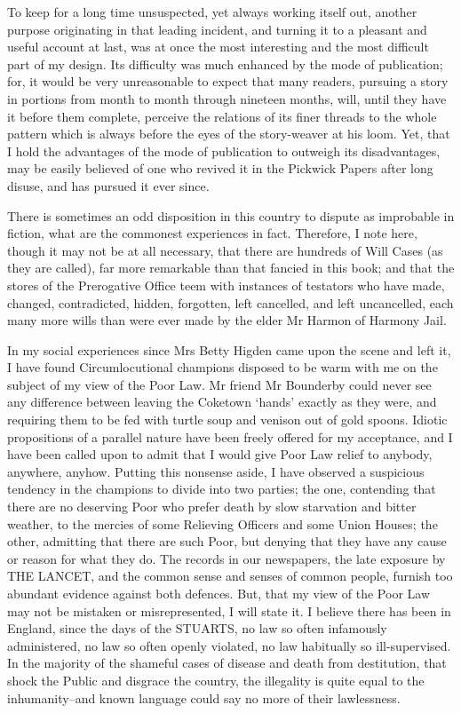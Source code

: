 To keep for a long time unsuspected, yet always working itself out,
another purpose originating in that leading incident, and turning it to
a pleasant and useful account at last, was at once the most interesting
and the most difficult part of my design. Its difficulty was much
enhanced by the mode of publication; for, it would be very unreasonable
to expect that many readers, pursuing a story in portions from month
to month through nineteen months, will, until they have it before them
complete, perceive the relations of its finer threads to the whole
pattern which is always before the eyes of the story-weaver at his loom.
Yet, that I hold the advantages of the mode of publication to outweigh
its disadvantages, may be easily believed of one who revived it in the
Pickwick Papers after long disuse, and has pursued it ever since.

There is sometimes an odd disposition in this country to dispute as
improbable in fiction, what are the commonest experiences in fact.
Therefore, I note here, though it may not be at all necessary, that
there are hundreds of Will Cases (as they are called), far more
remarkable than that fancied in this book; and that the stores of the
Prerogative Office teem with instances of testators who have made,
changed, contradicted, hidden, forgotten, left cancelled, and left
uncancelled, each many more wills than were ever made by the elder Mr
Harmon of Harmony Jail.

In my social experiences since Mrs Betty Higden came upon the scene and
left it, I have found Circumlocutional champions disposed to be
warm with me on the subject of my view of the Poor Law. Mr friend Mr
Bounderby could never see any difference between leaving the Coketown
‘hands’ exactly as they were, and requiring them to be fed with turtle
soup and venison out of gold spoons. Idiotic propositions of a parallel
nature have been freely offered for my acceptance, and I have been
called upon to admit that I would give Poor Law relief to anybody,
anywhere, anyhow. Putting this nonsense aside, I have observed a
suspicious tendency in the champions to divide into two parties; the
one, contending that there are no deserving Poor who prefer death by
slow starvation and bitter weather, to the mercies of some Relieving
Officers and some Union Houses; the other, admitting that there are such
Poor, but denying that they have any cause or reason for what they do.
The records in our newspapers, the late exposure by THE LANCET, and the
common sense and senses of common people, furnish too abundant evidence
against both defences. But, that my view of the Poor Law may not be
mistaken or misrepresented, I will state it. I believe there has been
in England, since the days of the STUARTS, no law so often infamously
administered, no law so often openly violated, no law habitually so
ill-supervised. In the majority of the shameful cases of disease and
death from destitution, that shock the Public and disgrace the country,
the illegality is quite equal to the inhumanity--and known language
could say no more of their lawlessness.

